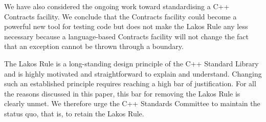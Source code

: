 We have also considered the ongoing work toward standardising a C++ Contracts facility. We conclude that the Contracts facility could become a powerful new tool for testing code but does not make the Lakos Rule any less necessary because a language-based Contracts facility will not change the fact that an exception cannot be thrown through a  boundary.

The Lakos Rule is a long-standing design principle of the C++ Standard Library and is highly motivated and straightforward to explain and understand. Changing such an established principle requires reaching a high bar of justification. For all the reasons discussed in this paper, this bar for removing the Lakos Rule is clearly unmet. We therefore urge the C++ Standards Committee to maintain the status quo, that is, to retain the Lakos Rule.





\renewcommand{\bibname}{References}




